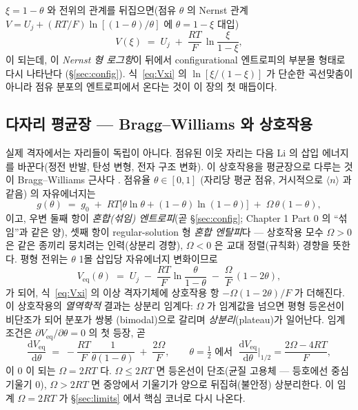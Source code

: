 \documentclass[11pt,a4paper]{article}
\newcommand{\dd}{\mathrm{d}}
\newcommand{\eq}{\mathrm{eq}}
\newcommand{\avg}[1]{\langle #1\rangle}
\begin{document}
$\xi=1-\theta$ 와 전위의 관계를 뒤집으면(점유 $\theta$ 의 Nernst 관계 $V=U_j+(RT/F)\ln[(1-\theta)/\theta]$ 에
$\theta=1-\xi$ 대입)
\begin{equation}
V(\xi) \;=\; U_j \;+\; \frac{RT}{F}\,\ln\!\frac{\xi}{1-\xi},
\label{eq:Vxi}
\end{equation}
이 되는데, 이 \emph{Nernst 형 로그항}이 뒤에서 configurational 엔트로피의 부분몰 형태로 다시 나타난다
(\S\ref{sec:config}). 식~\eqref{eq:Vxi} 의 $\ln[\xi/(1-\xi)]$ 가 단순한 곡선맞춤이 아니라 점유 분포의
엔트로피에서 온다는 것이 이 장의 첫 매듭이다.

\subsection{다자리 평균장 — Bragg--Williams 와 상호작용}\label{ssec:BW}
실제 격자에서는 자리들이 독립이 아니다. 점유된 이웃 자리는 다음 Li 의 삽입 에너지를 바꾼다(정전 반발,
탄성 변형, 전자 구조 변화). 이 상호작용을 평균장으로 다루는 것이 Bragg--Williams 근사다 \cite{huggins2009,
bazant2013}. 점유율 $\theta\in[0,1]$ (자리당 평균 점유, 거시적으로 $\avg{n}$ 과 같음) 의 자유에너지는
\begin{equation}
g(\theta) \;=\; g_0 \;+\; RT\bigl[\theta\ln\theta + (1-\theta)\ln(1-\theta)\bigr]
\;+\; \Omega\,\theta(1-\theta),
\label{eq:BW}
\end{equation}
이고, 우변 둘째 항이 \emph{혼합(섞임) 엔트로피}(곧 \S\ref{sec:config}; Chapter 1 Part 0 의 ``섞임''과 같은 양), 셋째 항이 regular-solution 형 \emph{혼합
엔탈피}다 — 상호작용 모수 $\Omega>0$ 은 같은 종끼리 뭉치려는 인력(상분리 경향), $\Omega<0$ 은
교대 정렬(규칙화) 경향을 뜻한다. 평형 전위는 $\theta$ 1몰 삽입당 자유에너지 변화이므로
\begin{equation}
V_\eq(\theta) \;=\; U_j \;-\; \frac{RT}{F}\ln\!\frac{\theta}{1-\theta} \;-\; \frac{\Omega}{F}\,(1-2\theta),
\label{eq:Veq_BW}
\end{equation}
가 되어, 식~\eqref{eq:Vxi} 의 이상 격자기체에 상호작용 항 $-\Omega(1-2\theta)/F$ 가 더해진다. 이 상호작용의
\emph{열역학적} 결과는 상분리 임계다: $\Omega$ 가 임계값을 넘으면 평형 등온선이 비단조가 되어 분포가 쌍봉
(bimodal)으로 갈리며 \emph{상분리}(plateau)가 일어난다. 임계 조건은 $\partial V_\eq/\partial\theta=0$ 의 첫 등장, 곧
\begin{equation}
\frac{\dd V_\eq}{\dd\theta} \;=\; -\frac{RT}{F}\frac{1}{\theta(1-\theta)} \;+\; \frac{2\Omega}{F},
\qquad
\theta=\tfrac12\text{ 에서 }\;\frac{\dd V_\eq}{\dd\theta}\Big|_{1/2}=\frac{2\Omega-4RT}{F},
\label{eq:slope_BW}
\end{equation}
이 0 이 되는 $\Omega=2RT$ 다. $\Omega\le2RT$ 면 등온선이 단조(균질 고용체 — 등호에선 중심 기울기 0), $\Omega>2RT$ 면 중앙에서
기울기가 양으로 뒤집혀(불안정) 상분리한다. 이 임계 $\Omega=2RT$ 가 \S\ref{sec:limits} 에서 핵심 코너로 다시
나온다.
\end{document}
